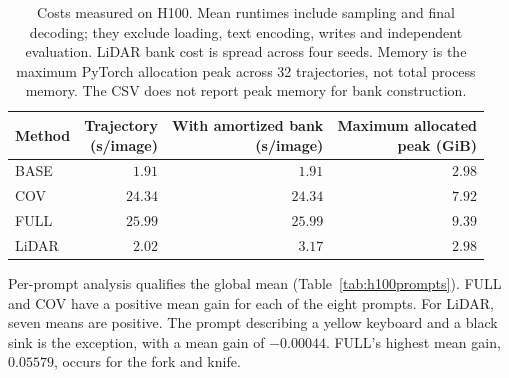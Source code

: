 \documentclass[11pt,a4paper]{article}
\begin{document}
\begin{table}[!htb]
\centering\small
\begin{tabular}{lrrr}
\toprule
Method & \shortstack{Trajectory\\(s/image)} & \shortstack{With amortized bank\\(s/image)} & \shortstack{Maximum allocated\\peak (GiB)}\\
\midrule
BASE & $1.91$ & $1.91$ & $2.98$\\
COV & $24.34$ & $24.34$ & $7.92$\\
FULL & $25.99$ & $25.99$ & $9.39$\\
LiDAR & $2.02$ & $3.17$ & $2.98$\\
\bottomrule
\end{tabular}
\caption{Costs measured on H100. Mean runtimes include sampling and final decoding; they exclude loading, text encoding, writes and independent evaluation. LiDAR bank cost is spread across four seeds. Memory is the maximum PyTorch allocation peak across 32 trajectories, not total process memory. The CSV does not report peak memory for bank construction.}
\label{tab:h100cost}
\end{table}

Per-prompt analysis qualifies the global mean (Table~\ref{tab:h100prompts}). FULL and COV have a positive mean gain for each of the eight prompts. For LiDAR, seven means are positive. The prompt describing a yellow keyboard and a black sink is the exception, with a mean gain of $-0.00044$. FULL's highest mean gain, $0.05579$, occurs for the fork and knife.
\end{document}
